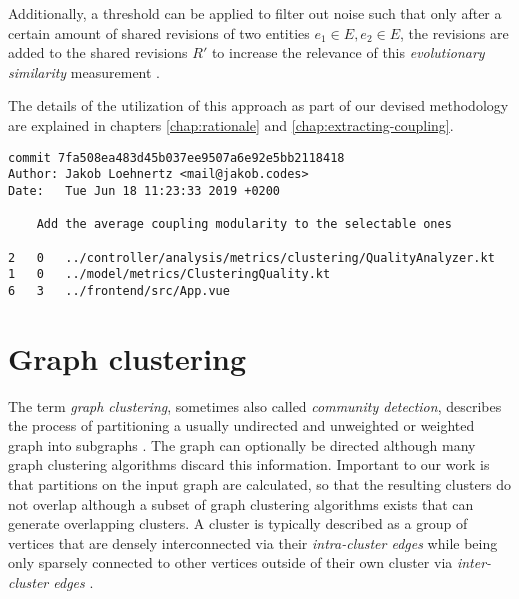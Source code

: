 \documentclass[12pt,a4paper]{report}
\begin{document}
Additionally, a threshold can be applied to filter out noise such that only
after a certain amount of shared revisions of two entities \(e_1 \in E, e_2 \in E\),
the revisions are added to the shared revisions \(R'\) to increase the relevance
of this \textit{evolutionary similarity} measurement \cite{tornhill2015crimescene}.

The details of the utilization of this approach as part of our devised methodology
are explained in chapters \ref{chap:rationale} and \ref{chap:extracting-coupling}.

\begin{lstlisting}[caption=Example Git log, label=git-log, breaklines=true]
commit 7fa508ea483d45b037ee9507a6e92e5bb2118418
Author: Jakob Loehnertz <mail@jakob.codes>
Date:   Tue Jun 18 11:23:33 2019 +0200

    Add the average coupling modularity to the selectable ones

2   0   ../controller/analysis/metrics/clustering/QualityAnalyzer.kt
1   0   ../model/metrics/ClusteringQuality.kt
6   3   ../frontend/src/App.vue
\end{lstlisting}



\section{Graph clustering} \label{sect:background-graph-clustering}

The term \textit{graph clustering}, sometimes also called \textit{community detection},
describes the process of partitioning a usually undirected
and unweighted or weighted graph into subgraphs \cite{lancichinetti2009community}.
The graph can optionally be directed although many graph clustering algorithms discard this information.
Important to our work is that partitions on the input graph are calculated,
so that the resulting clusters do not overlap although a subset of
graph clustering algorithms exists that can generate overlapping clusters.
A cluster is typically described as a group of vertices that are densely
interconnected via their \textit{intra-cluster edges} while being only sparsely
connected to other vertices outside of their own cluster via
\textit{inter-cluster edges} \cite{lancichinetti2009community, newman2004fast}.
\end{document}
